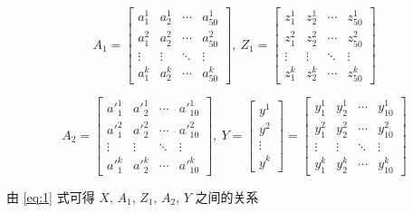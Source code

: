 \documentclass[12pt,a4paper]{amsart}
\begin{document}
\begin{equation}
	A_1 = \begin{bmatrix}
		a_1^1  & a_2^1  & \cdots & a_{50}^1 \\
		a_1^2  & a_2^2  & \cdots & a_{50}^2 \\
		\vdots & \vdots & \ddots & \vdots   \\
		a_1^k  & a_2^k  & \cdots & a_{50}^k
	\end{bmatrix}, ~ Z_1 = \begin{bmatrix}
		z_1^1  & z_2^1  & \cdots & z_{50}^1 \\
		z_1^2  & z_2^2  & \cdots & z_{50}^2 \\
		\vdots & \vdots & \ddots & \vdots   \\
		z_1^k  & z_2^k  & \cdots & z_{50}^k
	\end{bmatrix}
\end{equation}

\begin{equation}
	A_2 = \begin{bmatrix}
		{a'}_1^1 & {a'}_2^1 & \cdots & {a'}_{10}^1 \\
		{a'}_1^2 & {a'}_2^2 & \cdots & {a'}_{10}^2 \\
		\vdots   & \vdots   & \ddots & \vdots      \\
		{a'}_1^k & {a'}_2^k & \cdots & {a'}_{10}^k
	\end{bmatrix}, ~ Y = \begin{bmatrix}
		y^1    \\
		y^2    \\
		\vdots \\
		y^k
	\end{bmatrix} = \begin{bmatrix}
		y_1^1  & y_2^1  & \cdots & y_{10}^1 \\
		y_1^2  & y_2^2  & \cdots & y_{10}^2 \\
		\vdots & \vdots & \ddots & \vdots   \\
		y_1^k  & y_2^k  & \cdots & y_{10}^k
	\end{bmatrix}
\end{equation}

由 \ref{eq:1} 式可得 $X$, $A_1$, $Z_1$, $A_2$, $Y$ 之间的关系
\end{document}
